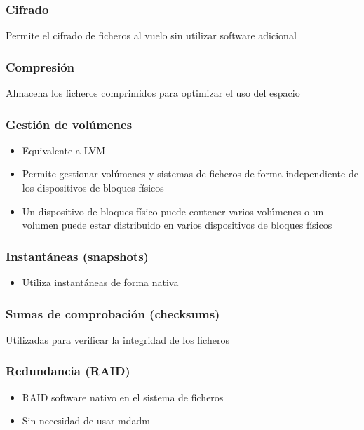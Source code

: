 \documentclass[aspectratio=169]{beamer}
\begin{document}
\begin{frame}
  \frametitle{Cifrado}
  Permite el cifrado de ficheros al vuelo sin utilizar software adicional
\end{frame}

\begin{frame}
  \frametitle{Compresión}
  Almacena los ficheros comprimidos para optimizar el uso del espacio
\end{frame}

\begin{frame}
  \frametitle{Gestión de volúmenes}
  \begin{itemize}
  \item Equivalente a LVM
  \item Permite gestionar volúmenes y sistemas de ficheros de forma
    independiente de los dispositivos de bloques físicos
  \item Un dispositivo de bloques físico puede contener varios
    volúmenes o un volumen puede estar distribuido en varios
    dispositivos de bloques físicos
  \end{itemize}
\end{frame}

\begin{frame}
  \frametitle{Instantáneas (snapshots)}
  \begin{itemize}
  \item Utiliza instantáneas de forma nativa
  \end{itemize}
\end{frame}

\begin{frame}
  \frametitle{Sumas de comprobación (checksums)}
  Utilizadas para verificar la integridad de los ficheros
\end{frame}

\begin{frame}
  \frametitle{Redundancia (RAID)}
  \begin{itemize}
  \item RAID software nativo en el sistema de ficheros
  \item Sin necesidad de usar mdadm
  \end{itemize}
\end{frame}
\end{document}
